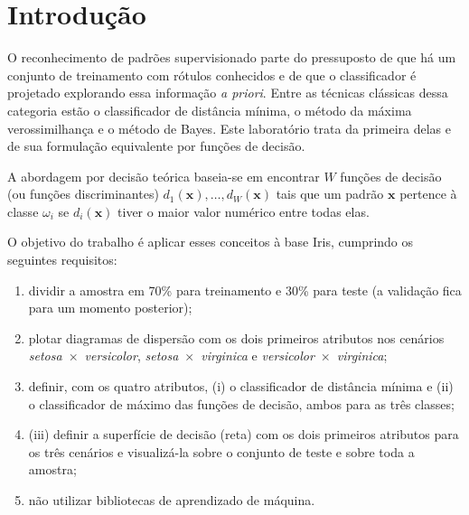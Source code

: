 \documentclass[12pt,a4paper]{article}
\begin{document}
\tableofcontents
\thispagestyle{empty}
\newpage

\section{Introdução}

O reconhecimento de padrões supervisionado parte do pressuposto de que há um conjunto de treinamento com rótulos conhecidos e de que o classificador é projetado explorando essa informação \emph{a priori}. Entre as técnicas clássicas dessa categoria estão o classificador de distância mínima, o método da máxima verossimilhança e o método de Bayes. Este laboratório trata da primeira delas e de sua formulação equivalente por funções de decisão.

A abordagem por decisão teórica baseia-se em encontrar $W$ funções de decisão (ou funções discriminantes) $d_1(\mathbf{x}), \dots, d_W(\mathbf{x})$ tais que um padrão $\mathbf{x}$ pertence à classe $\omega_i$ se $d_i(\mathbf{x})$ tiver o maior valor numérico entre todas elas.

O objetivo do trabalho é aplicar esses conceitos à base Iris, cumprindo os seguintes requisitos:
\begin{enumerate}
  \item dividir a amostra em 70\% para treinamento e 30\% para teste (a validação fica para um momento posterior);
  \item plotar diagramas de dispersão com os dois primeiros atributos nos cenários \emph{setosa}~$\times$~\emph{versicolor}, \emph{setosa}~$\times$~\emph{virginica} e \emph{versicolor}~$\times$~\emph{virginica};
  \item definir, com os quatro atributos, (i) o classificador de distância mínima e (ii) o classificador de máximo das funções de decisão, ambos para as três classes;
  \item (iii) definir a superfície de decisão (reta) com os dois primeiros atributos para os três cenários e visualizá-la sobre o conjunto de teste e sobre toda a amostra;
  \item não utilizar bibliotecas de aprendizado de máquina.
\end{enumerate}

\end{document}
